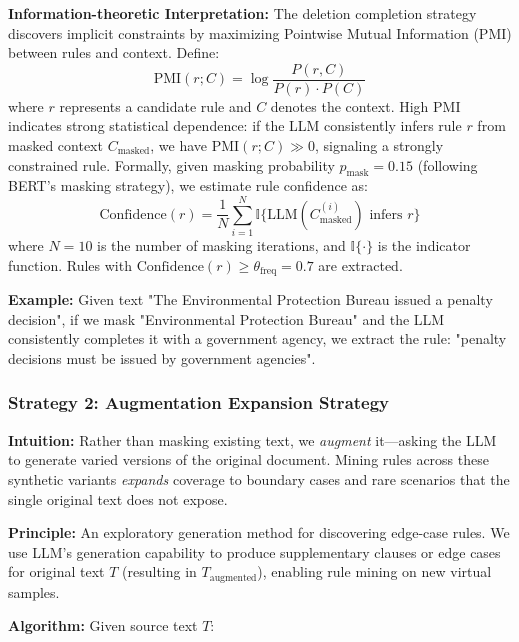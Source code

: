 \documentclass[runningheads]{llncs}
\begin{document}
\textbf{Information-theoretic Interpretation:} The deletion completion strategy discovers implicit constraints by maximizing Pointwise Mutual Information (PMI) between rules and context. Define:
\begin{equation}
\text{PMI}(r; C) = \log \frac{P(r, C)}{P(r) \cdot P(C)}
\end{equation}
where $r$ represents a candidate rule and $C$ denotes the context. High PMI indicates strong statistical dependence: if the LLM consistently infers rule $r$ from masked context $C_{\text{masked}}$, we have $\text{PMI}(r; C) \gg 0$, signaling a strongly constrained rule. Formally, given masking probability $p_{\text{mask}} = 0.15$ (following BERT's masking strategy), we estimate rule confidence as:
\begin{equation}
\text{Confidence}(r) = \frac{1}{N} \sum_{i=1}^{N} \mathbb{I}\{\text{LLM}(C_{\text{masked}}^{(i)}) \text{ infers } r\}
\end{equation}
where $N = 10$ is the number of masking iterations, and $\mathbb{I}\{\cdot\}$ is the indicator function. Rules with $\text{Confidence}(r) \geq \theta_{\text{freq}} = 0.7$ are extracted.

\textbf{Example:} Given text "The Environmental Protection Bureau issued a penalty decision", if we mask "Environmental Protection Bureau" and the LLM consistently completes it with a government agency, we extract the rule: "penalty decisions must be issued by government agencies".

\subsubsection{Strategy 2: Augmentation Expansion Strategy}

\textbf{Intuition:} Rather than masking existing text, we \textit{augment} it—asking the LLM to generate varied versions of the original document. Mining rules across these synthetic variants \textit{expands} coverage to boundary cases and rare scenarios that the single original text does not expose.

\textbf{Principle:} An exploratory generation method for discovering edge-case rules. We use LLM's generation capability to produce supplementary clauses or edge cases for original text $T$ (resulting in $T_{\text{augmented}}$), enabling rule mining on new virtual samples.

\textbf{Algorithm:} Given source text $T$:
\end{document}
